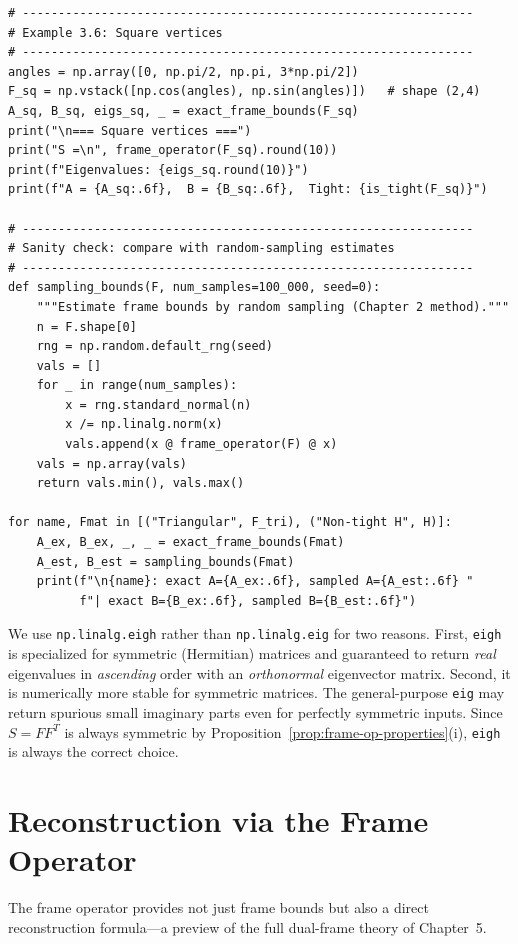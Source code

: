 \begin{lstlisting}[caption={Frame operator and exact bounds via eigenvalues}]
# ---------------------------------------------------------------
# Example 3.6: Square vertices
# ---------------------------------------------------------------
angles = np.array([0, np.pi/2, np.pi, 3*np.pi/2])
F_sq = np.vstack([np.cos(angles), np.sin(angles)])   # shape (2,4)
A_sq, B_sq, eigs_sq, _ = exact_frame_bounds(F_sq)
print("\n=== Square vertices ===")
print("S =\n", frame_operator(F_sq).round(10))
print(f"Eigenvalues: {eigs_sq.round(10)}")
print(f"A = {A_sq:.6f},  B = {B_sq:.6f},  Tight: {is_tight(F_sq)}")

# ---------------------------------------------------------------
# Sanity check: compare with random-sampling estimates
# ---------------------------------------------------------------
def sampling_bounds(F, num_samples=100_000, seed=0):
    """Estimate frame bounds by random sampling (Chapter 2 method)."""
    n = F.shape[0]
    rng = np.random.default_rng(seed)
    vals = []
    for _ in range(num_samples):
        x = rng.standard_normal(n)
        x /= np.linalg.norm(x)
        vals.append(x @ frame_operator(F) @ x)
    vals = np.array(vals)
    return vals.min(), vals.max()

for name, Fmat in [("Triangular", F_tri), ("Non-tight H", H)]:
    A_ex, B_ex, _, _ = exact_frame_bounds(Fmat)
    A_est, B_est = sampling_bounds(Fmat)
    print(f"\n{name}: exact A={A_ex:.6f}, sampled A={A_est:.6f} "
          f"| exact B={B_ex:.6f}, sampled B={B_est:.6f}")
\end{lstlisting}

\begin{remark*}
We use \texttt{np.linalg.eigh} rather than \texttt{np.linalg.eig} for two
reasons. First, \texttt{eigh} is specialized for symmetric (Hermitian)
matrices and guaranteed to return \emph{real} eigenvalues in
\emph{ascending} order with an \emph{orthonormal} eigenvector matrix.
Second, it is numerically more stable for symmetric matrices.
The general-purpose \texttt{eig} may return spurious small imaginary parts
even for perfectly symmetric inputs. Since $S=FF^T$ is always symmetric
by Proposition~\ref{prop:frame-op-properties}(i), \texttt{eigh} is always
the correct choice.
\end{remark*}

\section{Reconstruction via the Frame Operator}
\label{sec:reconstruction}

The frame operator provides not just frame bounds but also a direct
reconstruction formula---a preview of the full dual-frame theory of
Chapter~5.

